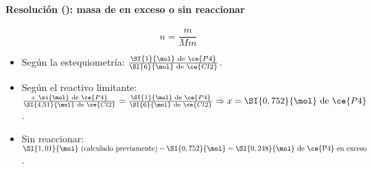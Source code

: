 \begin{frame}
    \frametitle{\ejerciciocmd}
    \framesubtitle{Resolución (): masa de  en exceso o sin reaccionar}
    \begin{center}
        \textbf{}
    \end{center}
    $$
        n=\frac{m}{Mm}
    $$
    \begin{itemize}
        \item<1-> Según la estequiometría: $\frac{\SI{1}{\mol}\text{ de }\ce{P4}}{\SI{6}{\mol}\text{ de }\ce{Cl2}}$.
        \item<2-> Según el reactivo limitante: $\frac{x~\si{\mol}\text{ de }\ce{P4}}{\SI{4,51}{\mol}\text{ de }\ce{Cl2}}=\frac{\SI{1}{\mol}\text{ de }\ce{P4}}{\SI{6}{\mol}\text{ de }\ce{Cl2}}\Rightarrow x=\SI{0,752}{\mol}\text{ de }\ce{P4}$.
        \item<3-> Sin reaccionar: $\SI{1,01}{\mol} \text{ (calculado previamente)} - \SI{0,752}{\mol} = \SI{0,248}{\mol}\text{ de \ce{P4} en exceso}$.
    \end{itemize}
\end{frame}
